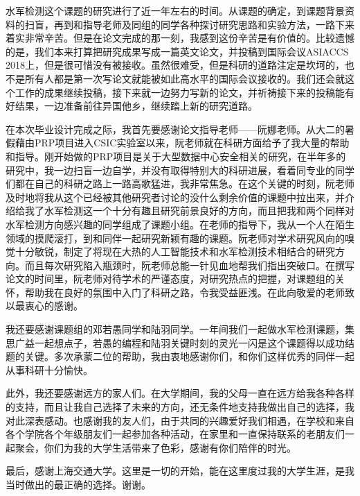 \begin{thanks}

  水军检测这个课题的研究进行了近一年左右的时间。从课题的确定，到课题背景资料的扫盲，再到和指导老师及同组的同学各种探讨研究思路和实验方法，一路下来着实非常辛苦。但是在论文完成的那一刻，我感到这份辛苦是有价值的。比较遗憾的是，我们本来打算把研究成果写成一篇英文论文，并投稿到国际会议ASIACCS 2018上，但是很可惜没有被接收。虽然很难受，但是科研的道路注定是坎坷的，也不是所有人都是第一次写论文就能被如此高水平的国际会议接收的。我们还会就这个工作的成果继续投稿，接下来就一边努力写新的论文，并祈祷接下来的投稿能有好结果，一边准备前往异国他乡，继续踏上新的研究道路。
  
  在本次毕业设计完成之际，我首先要感谢论文指导老师——阮娜老师。从大二的暑假藉由PRP项目进入CSIC实验室以来，阮老师就在科研方面给予了我大量的帮助和指导。刚开始做的PRP项目是关于大型数据中心安全相关的研究，在半年多的研究中，我一边扫盲一边自学，并没有取得特别大的科研进展，看着同专业的同学们都在自己的科研之路上一路高歌猛进，我非常焦急。在这个关键的时刻，阮老师及时地将我从这个已经被其他研究者讨论的没什么剩余价值的课题中拉出来，并介绍给我了水军检测这一个十分有趣且研究前景良好的方向，而且把我和两个同样对水军检测方向感兴趣的同学组成了课题小组。在老师的指导下，我从一个人在陌生领域的摸爬滚打，到和同伴一起研究新颖有趣的课题。阮老师对学术研究风向的嗅觉十分敏锐，制定了将现在大热的人工智能技术和水军检测技术相结合的研究方向。而且每次研究陷入瓶颈时，阮老师总能一针见血地帮我们指出突破口。在撰写论文的时间里，阮老师对待学术的严谨态度，对研究热点的把握，对课题组的关怀，帮助我在良好的氛围中入门了科研之路，令我受益匪浅。在此向敬爱的老师致以最衷心的感谢。
  
  我还要感谢课题组的邓若愚同学和陆羽同学。一年间我们一起做水军检测课题，集思广益一起想点子，若愚的编程和陆羽关键时刻的灵光一闪是这个课题得以成功结题的关键。多次承蒙二位的帮助，我由衷地感谢你们，和你们这样优秀的同伴一起从事科研十分愉快。
  
  此外，我还要感谢远方的家人们。在大学期间，我的父母一直在远方给我各种各样的支持，而且让我自己选择了未来的方向，还无条件地支持我做出自己的选择，我对此深表感动。也感谢我的友人们，由于共同的兴趣爱好我们相遇，在学校和来自各个学院各个年级朋友们一起参加各种活动，在家里和一直保持联系的老朋友们一起聚会，你们为我的大学生活带来了色彩，感谢有你们陪伴的时光。
  
  最后，感谢上海交通大学。这里是一切的开始，能在这里度过我的大学生涯，是我当时做出的最正确的选择。谢谢。

\end{thanks}
